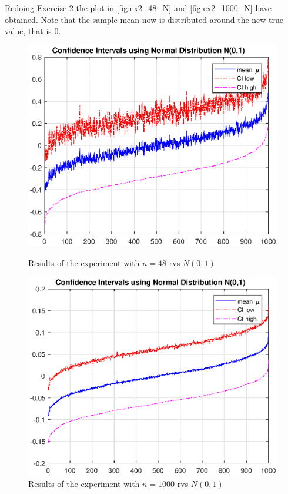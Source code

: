 \documentclass[11pt,a4paper]{article}
\begin{document}
\section{}

Redoing Exercise 2 the plot in \autoref{fig:ex2_48_N} and \autoref{fig:ex2_1000_N} have obtained.
Note that the sample mean now is distributed around the new true value, that is $0$.

\begin{figure}[ht]
	\centering
	\begin{minipage}{0.45\textwidth}
		\centering
		\includegraphics[width=\textwidth]{ex2_48_N}
		\caption{Results of the experiment with $n=48$ rvs $N(0,1)$}
		\label{fig:ex2_48_N}
	\end{minipage}
	\begin{minipage}{0.45\textwidth}
		\centering
		\includegraphics[width=\textwidth]{ex2_1000_N}
		\caption{Results of the experiment with $n=1000$ rvs $N(0,1)$}
		\label{fig:ex2_1000_N}
	\end{minipage}
\end{figure}
\end{document}
